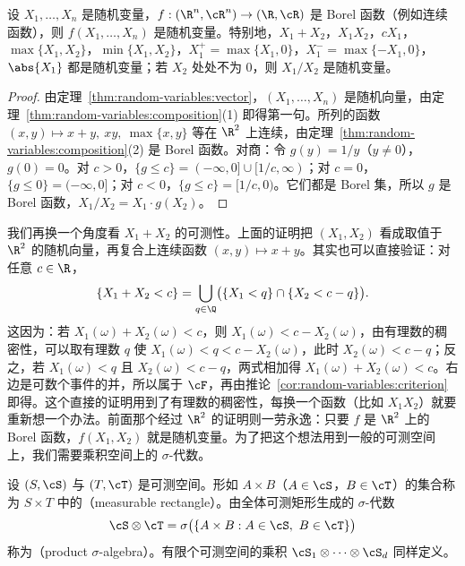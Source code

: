 \begin{corollary}\label{cor:random-variables:arithmetic}
设 $X_1,\dots,X_n$ 是随机变量，$f:(\R^n,\cR^n)\to(\R,\cR)$ 是 Borel 函数（例如连续函数），则 $f(X_1,\dots,X_n)$ 是随机变量。特别地，$X_1+X_2$，$X_1X_2$，$cX_1$，$\max\{X_1,X_2\}$，$\min\{X_1,X_2\}$，$X_1^+=\max\{X_1,0\}$，$X_1^-=\max\{-X_1,0\}$，$\abs{X_1}$ 都是随机变量；若 $X_2$ 处处不为 $0$，则 $X_1/X_2$ 是随机变量。
\end{corollary}
\begin{proof}
由定理~\ref{thm:random-variables:vector}，$(X_1,\dots,X_n)$ 是随机向量，由定理~\ref{thm:random-variables:composition}(1) 即得第一句。所列的函数 $(x,y)\mapsto x+y,\ xy,\ \max\{x,y\}$ 等在 $\R^2$ 上连续，由定理~\ref{thm:random-variables:composition}(2) 是 Borel 函数。对商：令 $g(y)=1/y$（$y\neq0$），$g(0)=0$。对 $c>0$，$\{g\leqslant c\}=(-\infty,0]\cup[1/c,\infty)$；对 $c=0$，$\{g\leqslant0\}=(-\infty,0]$；对 $c<0$，$\{g\leqslant c\}=[1/c,0)$。它们都是 Borel 集，所以 $g$ 是 Borel 函数，$X_1/X_2=X_1\cdot g(X_2)$。
\end{proof}

我们再换一个角度看 $X_1+X_2$ 的可测性。上面的证明把 $(X_1,X_2)$ 看成取值于 $\R^2$ 的随机向量，再复合上连续函数 $(x,y)\mapsto x+y$。其实也可以直接验证：对任意 $c\in\R$，
\[
\{X_1+X_2<c\}=\bigcup_{q\in\Q}\bigl(\{X_1<q\}\cap\{X_2<c-q\}\bigr).
\]
这因为：若 $X_1(\omega)+X_2(\omega)<c$，则 $X_1(\omega)<c-X_2(\omega)$，由有理数的稠密性，可以取有理数 $q$ 使 $X_1(\omega)<q<c-X_2(\omega)$，此时 $X_2(\omega)<c-q$；反之，若 $X_1(\omega)<q$ 且 $X_2(\omega)<c-q$，两式相加得 $X_1(\omega)+X_2(\omega)<c$。右边是可数个事件的并，所以属于 $\cF$，再由推论~\ref{cor:random-variables:criterion} 即得。这个直接的证明用到了有理数的稠密性，每换一个函数（比如 $X_1X_2$）就要重新想一个办法。前面那个经过 $\R^2$ 的证明则一劳永逸：只要 $f$ 是 $\R^2$ 上的 Borel 函数，$f(X_1,X_2)$ 就是随机变量。为了把这个想法用到一般的可测空间上，我们需要乘积空间上的 $\sigma$-代数。


\begin{definition}[乘积 $\sigma$-代数]\label{def:random-variables:product}
设 $(S,\cS)$ 与 $(T,\cT)$ 是可测空间。形如 $A\times B$（$A\in\cS$，$B\in\cT$）的集合称为 $S\times T$ 中的（measurable rectangle）。由全体可测矩形生成的 $\sigma$-代数
\[
\cS\otimes\cT=\sigma\bigl(\{A\times B: A\in\cS,\ B\in\cT\}\bigr)
\]
称为（product $\sigma$-algebra）。有限个可测空间的乘积 $\cS_1\otimes\cdots\otimes\cS_d$ 同样定义。
\end{definition}

